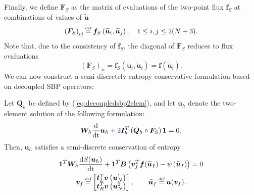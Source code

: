 \documentclass[review,onefignum,onetabnum,final]{siamart171218}
\renewcommand{\tilde}{\widetilde}
\newcommand{\td}[2]{\frac{{\rm d}#1}{{\rm d}{\rm #2}}}
\newcommand{\LRp}[1]{\left( #1 \right)}
\newcommand{\note}[1]{{\color{blue}{#1}}}
\newcommand\myeq{\mathrel{\stackrel{\makebox[0pt]{\mbox{\normalfont\tiny def}}}{=}}}
\begin{document}
Finally, we define $\bm{F}_S$ as the matrix of evaluations of the two-point flux $\bm{f}_S$ at combinations of values of $\tilde{\bm{u}}$
\[
\LRp{\bm{F}_S}_{ij} \myeq \bm{f}_S\LRp{\tilde{\bm{u}}_i,\tilde{\bm{u}}_j}, \quad 1\leq i,j \leq 2(N+3).
\]
Note that, due to the consistency of $\bm{f}_S$, the diagonal of $\bm{F}_S$ reduces to flux evaluations
\begin{equation}
\label{eq:diagFS}
\LRp{\bm{F}_S}_{ii} = \bm{f}_S\LRp{\tilde{\bm{u}}_i,\tilde{\bm{u}}_i} = \bm{f}\LRp{\tilde{\bm{u}}_i}.  
\end{equation}
We can now construct a semi-discretely entropy conservative formulation based on decoupled SBP operators:
\begin{theorem}
\label{thm:consentropy}
Let $\bm{Q}_h$ be defined by (\ref{eq:decoupledsbp2elem}), and let $\bm{u}_h$ denote the two-element solution of the following formulation:
\begin{gather}
\label{eq:form}
\bm{W}_h \td{}{t} \bm{u}_h + \note{2} \bm{I}_h^T\LRp{\bm{Q}_h \circ \bm{F}_S}\bm{1} = 0.
\end{gather}
Then, $\bm{u}_h$ satisfies a semi-discrete conservation of entropy
\begin{gather*}
\bm{1}^T\bm{W}_h\td{S(\bm{u}_h)}{t} + \bm{1}^T\bm{B}\LRp{\bm{v}_f^T\bm{f}(\tilde{\bm{u}}_f) - \psi\LRp{\tilde{\bm{u}}_f}} = 0\\
\bm{v}_f \myeq \begin{bmatrix}
\bm{t}_L^T \bm{v}\LRp{\bm{u}_N^1}\\
\bm{t}_R^T \bm{v}\LRp{\bm{u}_N^2}
\end{bmatrix}, \qquad \tilde{\bm{u}}_f \myeq \bm{u}(\bm{v}_f).
\end{gather*}
\end{theorem}
\end{document}
